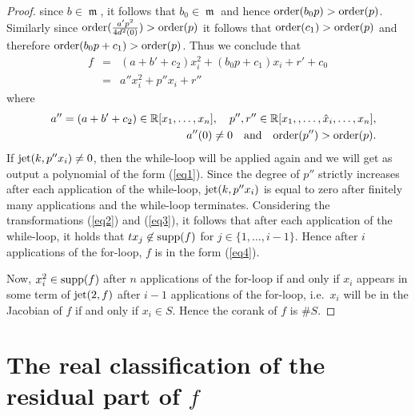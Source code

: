 \documentclass[noend]{amsproc}
\theoremstyle{definition}
\DeclareMathOperator{\m}{\mathfrak{m}}
\begin{document}
\begin{proof}
since $b\in\m$, it follows that $b_0\in\m$ and hence
$\textnormal{order}(b_0p)>\textnormal{order}(p)$. Similarly since
$\textnormal{order}(\frac{a'p^2}{4d^2(0)})>\textnormal{order}(p)$ it
follows that $\textnormal{order}(c_1)>\textnormal{order}(p)$ and therefore
$\textnormal{order}(b_0p+c_1)>\textnormal{order}(p)$. Thus we conclude that
\begin{eqnarray}
f&=&(a+b'+c_2)x_i^2+(b_0p+c_1)x_i+r'+c_0\nonumber\\
&=&a''x_i^2+p''x_i+r''\label{eq1}
\end{eqnarray}
where
\begin{eqnarray*}
&&a'' = (a+b'+c_2)\in\mathbb R[x_1,\ldots,x_n],\quad
p'',r''\in\mathbb R[x_1,,\ldots,\hat x_i,\ldots,x_n],\\
&&a''(0)\neq0\quad\textnormal{and}\quad\textnormal{order}(p'')
>\textnormal{order}(p).
\end{eqnarray*}
If $\textnormal{jet}(k,p''x_i)\neq 0$, then the while-loop will be applied
again
and we will get as output a polynomial of the form (\ref{eq1}). Since
the degree
of $p''$ strictly increases after each application of the while-loop,
$\textnormal{jet}(k,p''x_i)$ is equal to zero after finitely many applications
and the while-loop terminates. Considering the transformations  (\ref{eq2})
and
(\ref{eq3}), it follows that after each application of the while-loop,
it holds
that $tx_j\not\in\textnormal{supp}(f)$ for $j\in\{1,\ldots,i-1\}$. Hence
after $i$ applications of the for-loop, $f$ is in the form (\ref{eq4}).

Now, $x_i^2\in\textnormal{supp}(f)$ after $n$ applications of the for-loop
if and only if $x_i$ appears in some term of $\textnormal{jet}(2,f)$ after
$i-1$ applications of the for-loop, i.e.~$x_i$ will be in the Jacobian of
$f$ if and only if $x_i\in S$. Hence the corank of $f$ is $\#S$.
\end{proof}

\section{The real classification of the residual part of $f$}%
\label{TheRealClassificationOfTheResidualPart}
\end{document}
